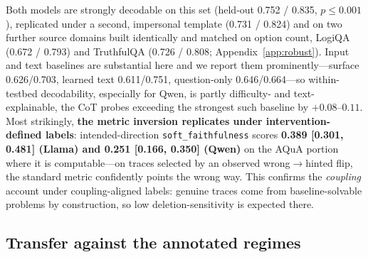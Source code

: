 \documentclass[11pt]{article}
\begin{document}
Both models are strongly decodable on this set (held-out 0.752 / 0.835, $p{\leq}0.001$), replicated under a second, impersonal template (0.731 / 0.824) and on two further source domains built identically and matched on option count, LogiQA (0.672 / 0.793) and TruthfulQA (0.726 / 0.808; Appendix~\ref{app:robust}). Input and text baselines are substantial here and we report them prominently---surface 0.626/0.703, learned text 0.611/0.751, question-only 0.646/0.664---so within-testbed decodability, especially for Qwen, is partly difficulty- and text-explainable, the CoT probes exceeding the strongest such baseline by $+0.08$--$0.11$. Most strikingly, \textbf{the metric inversion replicates under intervention-defined labels}: intended-direction \texttt{soft\_faithfulness} scores \textbf{0.389 [0.301, 0.481] (Llama) and 0.251 [0.166, 0.350] (Qwen)} on the AQuA portion where it is computable---on traces selected by an observed wrong$\to$hinted flip, the standard metric confidently points the wrong way. This confirms the \emph{coupling} account under coupling-aligned labels: genuine traces come from baseline-solvable problems by construction, so low deletion-sensitivity is expected there.

\subsection{Transfer against the annotated regimes}
\label{sec:bridge}
\end{document}
